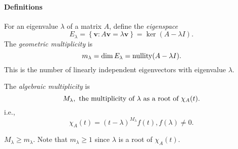 \documentclass[a4paper]{article}
\begin{document}
    \paragraph{Definitions}
    \begin{definition}
      For an eigenvalue $ \lambda $ of a matrix $A$, define the
      \textit{eigenspace}
      \[
        E_\lambda=\left\{ \mathbf{v}:A\mathbf{v}=\lambda\mathbf{v}
        \right\}=\ker (A-\lambda I)
      .\]
      The \textit{geometric multiplicity} is
      \[
        m_\lambda=\dim E_\lambda=\operatorname{nullity}(A-\lambda I)
      .\]
      This is the number of linearly independent eigenvectors with
      eigenvalue $ \lambda $.

      The \textit{algebraic multiplicity} is
      \[
        M_\lambda, \text{ the multiplicity of $\lambda$ as a root of
        $ \chi_A(t) $}
      .\]
      i.e.,
      \[
        \chi_A(t)=(t-\lambda)^{M_\lambda}f(t), f(\lambda)\neq 0
      .\]
    \end{definition}
    \begin{proposition}
      $ M_\lambda\ge m_\lambda $. Note that $ m_\lambda\ge 1 $ since
      $ \lambda $ is a root of $ \chi_A(t) $.
    \end{proposition}
\end{document}
